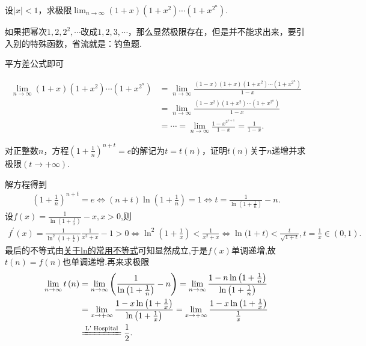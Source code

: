 \documentclass[../../main.tex]{subfiles}
\begin{document}
\begin{example}
设\(\vert x\vert < 1\)，求极限\(\lim_{n\rightarrow\infty}(1 + x)(1 + x^2)\cdots(1 + x^{2^n})\).
\end{example}
\begin{remark}
如果把幂次\(1,2,2^2,\cdots\)改成\(1,2,3,\cdots\)，那么显然极限存在，但是并不能求出来，要引入别的特殊函数，省流就是：钓鱼题.
\end{remark}
\begin{note}
平方差公式即可
\end{note}
\begin{solution}
\begin{align*}
\lim_{n\rightarrow \infty} (1+x)(1+x^2)\cdots (1+x^{2^n})&=\lim_{n\rightarrow \infty} \frac{(1-x)(1+x)(1+x^2)\cdots (1+x^{2^n})}{1-x}
\\
&=\lim_{n\rightarrow \infty} \frac{(1-x^2)(1+x^2)\cdots (1+x^{2^n})}{1-x}\\
&=\cdots =\lim_{n\rightarrow \infty} \frac{1-x^{2^{n+1}}}{1-x}=\frac{1}{1-x}.
\end{align*}
\end{solution}

\begin{example}
对正整数\(n\)，方程\(\left(1 + \frac{1}{n}\right)^{n + t}=e\)的解记为\(t = t(n)\)，证明\(t(n)\)关于\(n\)递增并求极限\((t\to +\infty)\).
\end{example}
\begin{solution}
解方程得到
\begin{align*}
\left(1 + \frac{1}{n}\right)^{n + t}=e\Leftrightarrow(n + t)\ln\left(1 + \frac{1}{n}\right)=1\Leftrightarrow t=\frac{1}{\ln\left(1 + \frac{1}{n}\right)}-n.
\end{align*}
设$f(x)=\frac{1}{\ln\left(1 + \frac{1}{x}\right)}-x,x>0$,则
\begin{align*}
f^\prime(x)=\frac{1}{\ln^{2}\left(1 + \frac{1}{x}\right)}\frac{1}{x^{2}+x}-1>0
\Leftrightarrow\ln^{2}\left(1 + \frac{1}{x}\right)<\frac{1}{x^{2}+x}\Leftrightarrow\ln\mathrm{(}1+t)<\frac{t}{\sqrt{1+t}},t=\frac{1}{x}\in \left( 0,1 \right) .
\end{align*}
最后的不等式由\hyperref[proposition:常用不等式1]{关于ln的常用不等式}可知显然成立,于是$f(x)$单调递增,故$t(n)=f(n)$也单调递增.再来求极限
\begin{align*}
\lim_{n\rightarrow \infty} t\left( n \right) &=\lim_{n\rightarrow \infty} \left( \frac{1}{\ln \left( 1+\frac{1}{n} \right)}-n \right) =\lim_{n\rightarrow \infty} \frac{1-n\ln \left( 1+\frac{1}{n} \right)}{\ln \left( 1+\frac{1}{n} \right)}
\\
&=\lim_{x\rightarrow +\infty} \frac{1-x\ln \left( 1+\frac{1}{x} \right)}{\ln \left( 1+\frac{1}{x} \right)}=\lim_{x\rightarrow +\infty} \frac{1-x\ln \left( 1+\frac{1}{x} \right)}{\frac{1}{x}}
\\
&\xlongequal{\text{L' Hospital}}\frac{1}{2}.
\end{align*}
\end{solution}
\end{document}
